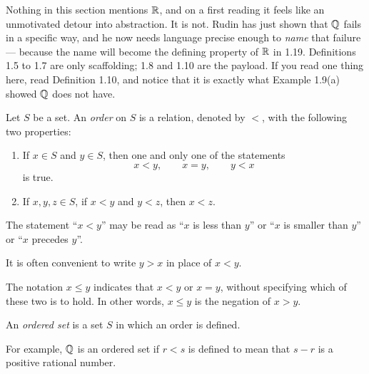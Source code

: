 
\begin{signpost}
Nothing in this section mentions $\mathbb{R}$, and on a first reading it feels like an
unmotivated detour into abstraction. It is not. Rudin has just shown that $\mathbb{Q}$
fails in a specific way, and he now needs language precise enough to \emph{name}
that failure --- because the name will become the defining property of $\mathbb{R}$ in
1.19. Definitions 1.5 to 1.7 are only scaffolding; 1.8 and 1.10 are the payload.
If you read one thing here, read Definition 1.10, and notice that it is exactly
what Example 1.9(a) showed $\mathbb{Q}$ does not have.
\end{signpost}

Let $S$ be a set. An \emph{order} on $S$ is a relation, denoted by $<$, with the
following two properties:
\begin{enumerate}[label=(\roman*), leftmargin=2.2em, itemsep=2pt, topsep=4pt]
  \item If $x \in S$ and $y \in S$, then one and only one of the statements
        \[ x < y, \qquad x = y, \qquad y < x \]
        is true.
  \item If $x, y, z \in S$, if $x < y$ and $y < z$, then $x < z$.
\end{enumerate}
The statement ``$x < y$'' may be read as ``$x$ is less than $y$'' or ``$x$ is
smaller than $y$'' or ``$x$ precedes $y$''.

It is often convenient to write $y > x$ in place of $x < y$.

The notation $x \le y$ indicates that $x < y$ or $x = y$, without specifying
which of these two is to hold. In other words, $x \le y$ is the negation of
$x > y$.

An \emph{ordered set} is a set $S$ in which an order is defined.

For example, $\mathbb{Q}$ is an ordered set if $r < s$ is defined to mean that $s - r$
is a positive rational number.


